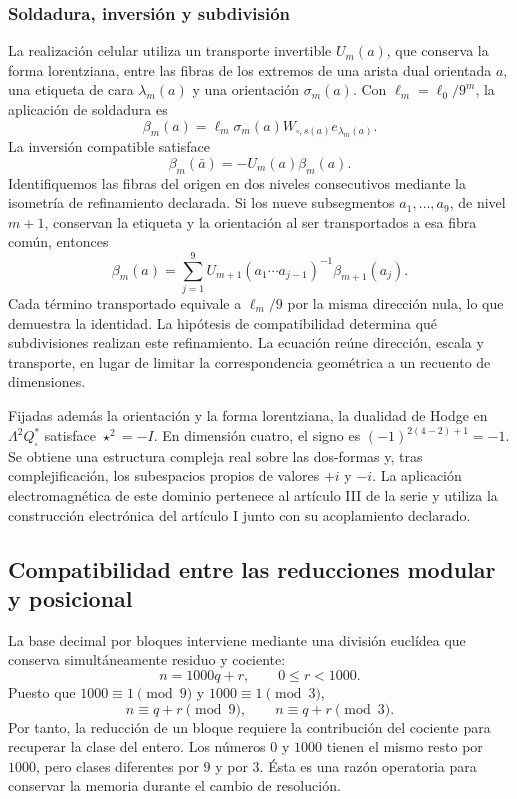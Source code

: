 \subsubsection{Soldadura, inversión y subdivisión}

La realización celular utiliza un transporte invertible \(U_m(a)\),
que conserva la forma lorentziana, entre las fibras de los extremos de
una arista dual orientada \(a\), una etiqueta
de cara \(\lambda_m(a)\) y una orientación \(\sigma_m(a)\).
Con \(\ell_m=\ell_0/9^m\), la aplicación de soldadura es
\[
 \beta_m(a)=\ell_m\sigma_m(a)
 W_{\square,s(a)}e_{\lambda_m(a)}.
\]
La inversión compatible satisface
\[
 \beta_m(\bar a)=-U_m(a)\beta_m(a).
\]
Identifiquemos las fibras del origen en dos niveles consecutivos mediante
la isometría de refinamiento declarada. Si los nueve subsegmentos
\(a_1,\ldots,a_9\), de nivel \(m+1\), conservan la etiqueta
y la orientación al ser transportados a esa fibra común, entonces
\begin{equation}
 \beta_m(a)=\sum_{j=1}^9
 U_{m+1}(a_1\cdots a_{j-1})^{-1}\beta_{m+1}(a_j).
 \label{eq:soldadura-refinamiento}
\end{equation}
Cada término transportado equivale a \(\ell_m/9\) por la misma
dirección nula, lo que demuestra la identidad. La hipótesis de
compatibilidad determina qué subdivisiones realizan este refinamiento.
La ecuación reúne dirección, escala y transporte, en lugar de limitar
la correspondencia geométrica a un recuento de dimensiones.

Fijadas además la orientación y la forma lorentziana, la dualidad de
Hodge en \(\Lambda^2Q_\square^*\) satisface \(\star^2=-I\).
En dimensión cuatro, el signo es \((-1)^{2(4-2)+1}=-1\).
Se obtiene una estructura compleja real sobre las dos-formas y,
tras complejificación, los subespacios propios de valores \(+i\) y
\(-i\). La aplicación electromagnética de este dominio pertenece al
artículo III de la serie y utiliza la construcción electrónica del
artículo I junto con su acoplamiento declarado.

\subsection{Compatibilidad entre las reducciones modular y posicional}

La base decimal por bloques interviene mediante una división euclídea
que conserva simultáneamente residuo y cociente:
\[
 n=1000q+r,\qquad 0\le r<1000.
\]
Puesto que \(1000\equiv1\pmod9\) y \(1000\equiv1\pmod3\),
\[
 n\equiv q+r\pmod9,\qquad n\equiv q+r\pmod3.
\]
Por tanto, la reducción de un bloque requiere la contribución del
cociente para recuperar la clase del entero. Los números \(0\) y
\(1000\) tienen el mismo resto por \(1000\), pero clases diferentes
por \(9\) y por \(3\). Ésta es una razón operatoria para conservar
la memoria durante el cambio de resolución.

